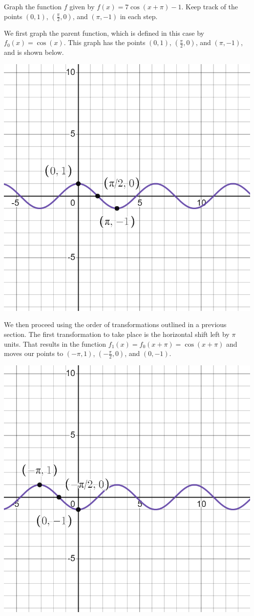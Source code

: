 \documentclass{ximera}
\begin{document}
\begin{example}
Graph the function $f$ given by $f(x) = 7\cos(x + \pi) - 1$. Keep track of the points $(0, 1)$, $\left(\frac{\pi}{2}, 0\right)$, and $(\pi, -1)$ in each step. 
\begin{explanation}
We first graph the parent function, which is defined in this case by $f_0(x) = \cos(x)$. This graph has the points $(0, 1)$, $\left(\frac{\pi}{2}, 0\right)$, and $(\pi, -1)$, and is shown below.
\begin{image}
\includegraphics[width=0.8\linewidth]{images/graph-ex1.png}
\end{image}

We then proceed using the order of transformations outlined in a previous section. The first transformation to take place is the horizontal shift left by $\pi$ units. That results in the function $f_1(x) = f_0(x + \pi) = \cos(x + \pi)$ and moves our points to $(-\pi, 1)$, $\left(-\frac{\pi}{2}, 0\right)$, and $(0, -1)$.
\begin{image}
\includegraphics[width=0.8\linewidth]{images/graph-ex2.png}
\end{image} 


\end{explanation}
\end{example}
\end{document}
